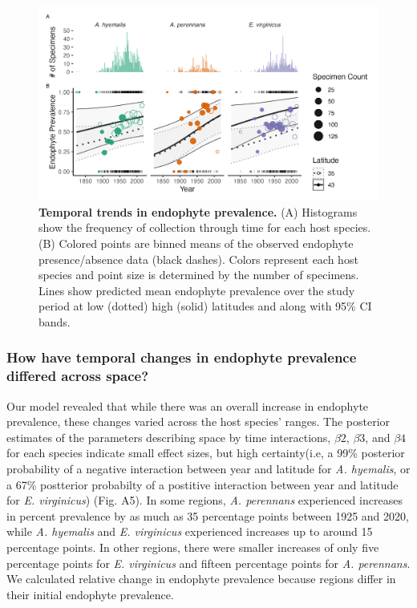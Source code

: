 \documentclass[11pt]{article}
\begin{document}
\begin{figure}[H]
	\centering
	\includegraphics[width = \linewidth]{year_plot.png}
	\caption{\textbf{Temporal trends in endophyte prevalence.} (A) Histograms show the frequency of collection through time for each host species. (B) Colored points are binned means of the observed endophyte presence/absence data (black dashes). Colors represent each host species and point size is determined by the number of specimens. Lines show predicted mean endophyte prevalence over the study period at low (dotted) high (solid) latitudes and along with 95\% CI bands.}
\end{figure}

\subsubsection*{How have temporal changes in endophyte prevalence differed across space?}
Our model revealed that while there was an overall increase in endophyte prevalence, these changes varied across the host species' ranges.
The posterior estimates of the parameters describing space by time interactions, $\beta2$, $\beta3$, and $\beta4$ for each species indicate small effect sizes, but high certainty(i.e, a 99\% posterior probability of a negative interaction between year and latitude for \emph{A. hyemalis}, or a 67\% postterior probabilty of a postitive interaction between year and latitude for \emph{E. virginicus}) (Fig. A5).
In some regions, \emph{A. perennans} experienced increases in percent prevalence by as much as 35 percentage points between 1925 and 2020, while \emph{A. hyemalis} and \emph{E. virginicus} experienced increases up to around 15 percentage points. 
In other regions, there were smaller increases of only five percentage points for \emph{E. virginicus} and fifteen percentage points for \emph{A. perennans}. 
We calculated relative change in endophyte prevalence because regions differ in their initial endophyte prevalence.
\end{document}
